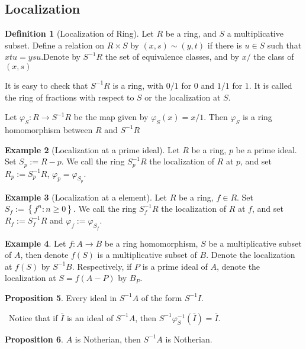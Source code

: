 \documentclass[a4paper,12pt]{article}
\newenvironment{prooff}{{\noindent\it\textcolor{cyan!40!black}{Proof}:}\,}{\par}
\newcommand{\bbrace}[1]{\left\{ #1 \right\} }
\theoremstyle{definition}
\newtheorem{defn}{Definition}[subsection]
\newtheorem{prop}[defn]{Proposition}
\newtheorem{exam}[defn]{Example}
\begin{document}
\subsection{Localization}
\begin{defn}[Localization of Ring]
    Let $R$ be a ring, and $S$ a multiplicative subset. Define a
    relation on $R\times S$ by $(x,s)\sim (y,t)$ if there is $u\in S$ such that $xtu = ysu$.Denote by $S^{-1}R$ the set of equivalence classes, and by $x/$ the class of $(x,s)$

    It is easy to check that $S^{-1}R$ is a ring, with $0/1$ for $0$ and $1/1$ for $1$. It is called
    the ring of fractions with respect to $S$ or the localization at $S$.

    Let $\varphi_S: R \rightarrow S^{-1}R$ be the map given by $\varphi_S(x)= x/1$. Then $\varphi_S$ is a ring homomorphism between $R$ and $S^{-1}R$
\end{defn}
\begin{exam}[Localization at a prime ideal]
    Let $R$ be a ring, $p$ be a prime ideal. Set $S_p:=R-p$. We call the
    ring $S_p^{-1}R$ the localization of $R$ at $p$, and set $R_p:=S_p^{-1}R$, $\varphi_p=\varphi_{S_p}$.
\end{exam}
\begin{exam}[Localization at a element]
    Let $R$ be a ring, $f\in R$. Set $S_f:=\bbrace{f^n:n\ge 0}$. We call the
    ring $S^{-1}_f R$ the localization of $R$ at $f$, and set $R_f:=S_f^{-1}R$ and $\varphi_{f} :=\varphi_{S_f}$.
\end{exam}
\begin{exam}
    Let $f:A\rightarrow B$ be a ring homomorphism, $S$ be a multiplicative subset of $A$, then denote $f(S)$ is a multiplicative subset of $B$. Denote the localization at $f(S)$ by $S^{-1}B$.
    Respectively, if $P$ is a prime ideal of $A$, denote the localization at $S=f(A-P)$ by $B_P$.
\end{exam}
\begin{prop}
    Every ideal in $S^{-1}A$ of the form $S^{-1}I$.
\end{prop}
\begin{prooff}
    Notice that if $\bar{I}$ is an ideal of $S^{-1}A$, then $S^{-1}\varphi_S^{-1}(\bar{I})=\bar{I}$.
\end{prooff}
\begin{prop}
    $A$ is Notherian, then $S^{-1}A$ is Notherian.
\end{prop}
\end{document}
